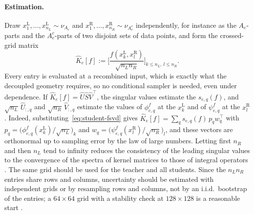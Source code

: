 \documentclass[11pt]{article}
\theoremstyle{definition}
\numberwithin{equation}{section}
\begin{document}
\paragraph{Estimation.}
Draw $x^{\mathrm L}_1,\dots,x^{\mathrm L}_{n_L}\sim\nu_{A_e}$ and $x^{\mathrm R}_1,\dots,x^{\mathrm R}_{n_R}\sim\nu_{A_e^c}$ independently, for instance as the $A_e$-parts and the $A_e^c$-parts of two disjoint sets of data points, and form the crossed-grid matrix
\begin{equation}\label{eq:crossed-grid}
\hat K_e[f]:=\bigg[\frac{f(x^{\mathrm L}_k,x^{\mathrm R}_l)}{\sqrt{n_Ln_R}}\bigg]_{k\le n_L,\ l\le n_R}.
\end{equation}
Every entry is evaluated at a recombined input, which is exactly what the decoupled geometry requires, so no conditional sampler is needed, even under dependence. If $\hat K_e[f]=\hat U\hat S\hat V^\top$, the singular values estimate the $s_{e,q}(f)$, and $\sqrt{n_L}\,\hat U_{:,q}$ and $\sqrt{n_R}\,\hat V_{:,q}$ estimate the values of $\phi^f_{e,q}$ at the $x^{\mathrm L}_k$ and of $\psi^f_{e,q}$ at the $x^{\mathrm R}_l$ \citep[Section~8.4]{hfl_local}. Indeed, substituting~\eqref{eq:student-fsvd} gives $\hat K_e[f]=\sum_qs_{e,q}(f)\,p_qw_q^\top$ with $p_q=\big(\phi^f_{e,q}(x^{\mathrm L}_k)/\sqrt{n_L}\big)_k$ and $w_q=\big(\psi^f_{e,q}(x^{\mathrm R}_l)/\sqrt{n_R}\big)_l$, and these vectors are orthonormal up to sampling error by the law of large numbers. Letting first $n_R$ and then $n_L$ tend to infinity reduces the consistency of the leading singular values to the convergence of the spectra of kernel matrices to those of integral operators \citep{koltchinskii2000random}. The same grid should be used for the teacher and all students. Since the $n_Ln_R$ entries share rows and columns, uncertainty should be estimated with independent grids or by resampling rows and columns, not by an i.i.d.\ bootstrap of the entries; a $64\times64$ grid with a stability check at $128\times128$ is a reasonable start \citep[Sections~9 and~10.2]{hfl_surrogate}.
\end{document}

